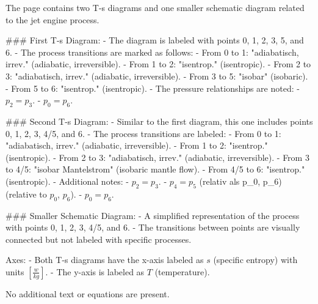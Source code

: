 The page contains two T-s diagrams and one smaller schematic diagram related to the jet engine process.  

### First T-s Diagram:  
- The diagram is labeled with points 0, 1, 2, 3, 5, and 6.  
- The process transitions are marked as follows:  
  - From 0 to 1: "adiabatisch, irrev." (adiabatic, irreversible).  
  - From 1 to 2: "isentrop." (isentropic).  
  - From 2 to 3: "adiabatisch, irrev." (adiabatic, irreversible).  
  - From 3 to 5: "isobar" (isobaric).  
  - From 5 to 6: "isentrop." (isentropic).  
- The pressure relationships are noted:  
  - \( p_2 = p_3 \).  
  - \( p_0 = p_6 \).  

### Second T-s Diagram:  
- Similar to the first diagram, this one includes points 0, 1, 2, 3, 4/5, and 6.  
- The process transitions are labeled:  
  - From 0 to 1: "adiabatisch, irrev." (adiabatic, irreversible).  
  - From 1 to 2: "isentrop." (isentropic).  
  - From 2 to 3: "adiabatisch, irrev." (adiabatic, irreversible).  
  - From 3 to 4/5: "isobar Mantelstrom" (isobaric mantle flow).  
  - From 4/5 to 6: "isentrop." (isentropic).  
- Additional notes:  
  - \( p_2 = p_3 \).  
  - \( p_4 = p_5 \) (relativ als p_0, p_6) (relative to \( p_0 \), \( p_6 \)).  
  - \( p_0 = p_6 \).  

### Smaller Schematic Diagram:  
- A simplified representation of the process with points 0, 1, 2, 3, 4/5, and 6.  
- The transitions between points are visually connected but not labeled with specific processes.  

Axes:  
- Both T-s diagrams have the x-axis labeled as \( s \) (specific entropy) with units \( [\frac{w}{kg}] \).  
- The y-axis is labeled as \( T \) (temperature).  

No additional text or equations are present.